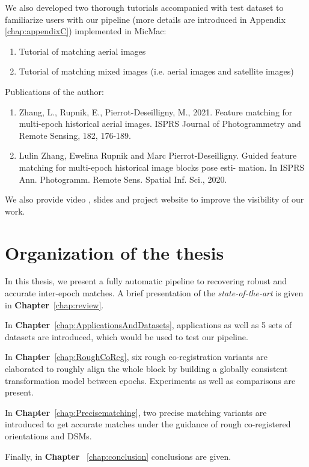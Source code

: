 \par
We also developed two thorough tutorials accompanied with test dataset to familiarize users with our pipeline (more details are introduced in Appendix \ref{chap:appendixC}) implemented in MicMac\cite{HistoPcode}:
\begin{enumerate}
	\item Tutorial of matching aerial images \cite{tuto-aerial} %
	\item Tutorial of matching mixed images (i.e. aerial images and satellite images) \cite{tuto-mixed} %
\end{enumerate}

\par
Publications of the author:
\begin{enumerate}
	\item Zhang, L., Rupnik, E., Pierrot-Deseilligny, M., 2021. Feature matching for multi-epoch historical aerial images. ISPRS Journal of Photogrammetry and Remote Sensing, 182, 176-189.
	\item Lulin Zhang, Ewelina Rupnik and Marc Pierrot-Deseilligny.
	Guided feature matching for multi-epoch historical image blocks pose esti-
	mation. In ISPRS Ann. Photogramm. Remote Sens. Spatial Inf. Sci., 2020.
\end{enumerate}
We also provide video \cite{HistoPVideo}, slides \cite{HistoPSlides} and project website \cite{HistoPProj} to improve the visibility of our work.

\section{Organization of the thesis}
In this thesis, we present a fully automatic pipeline to recovering robust and accurate inter-epoch matches. %
A brief presentation of the \textit{state-of-the-art} is given in \textbf{Chapter}~\ref{chap:review}. 

In \textbf{Chapter}~\ref{chap:ApplicationsAndDatasets}, applications as well as 5 sets of datasets are introduced, which would be used to test our pipeline.

In \textbf{Chapter}~\ref{chap:RoughCoReg}, six rough co-registration variants are elaborated to roughly align the whole block by building a globally consistent transformation model between epochs.
Experiments as well as comparisons are present.

In \textbf{Chapter}~\ref{chap:Precisematching}, two precise matching variants are introduced to get accurate matches under the guidance of rough co-registered orientations and \ac{DSM}s.

Finally, in \textbf{Chapter} ~\ref{chap:conclusion} conclusions are given.

